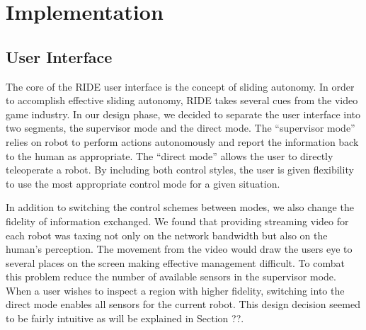 \chapter{Implementation}



\section{User Interface}
\label{sec:ride_user_interface}

The core of the RIDE user interface is the concept of sliding autonomy. In order to accomplish effective sliding autonomy, RIDE takes several cues from the video game industry. In our design phase, we decided to separate the user interface into two segments, the supervisor mode and the direct mode. The ``supervisor mode'' relies on robot to perform actions autonomously and report the information back to the human as appropriate. The ``direct mode'' allows the user to directly teleoperate a robot. By including both control styles, the user is given flexibility to use the most appropriate control mode for a given situation.

In addition to switching the control schemes between modes, we also change the fidelity of information exchanged. We found that providing streaming video for each robot was taxing not only on the network bandwidth but also on the human's perception. The movement from the video would draw the users eye to several places on the screen making effective management difficult. To combat this problem reduce the number of available sensors in the supervisor mode. When a user wishes to inspect a region with higher fidelity, switching into the direct mode enables all sensors for the current robot. This design decision seemed to be fairly intuitive as will be explained in Section ??.

